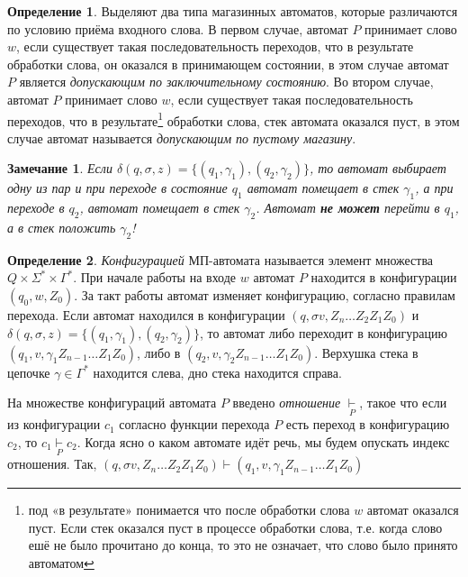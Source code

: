 \documentclass[12pt]{article}
\theoremstyle{definiton}
\newtheorem{Remark}{Замечание}
\theoremstyle{definition}
\theoremstyle{definition}
\newtheorem{Def}{Определение}
\begin{document}
\begin{Def}
	Выделяют два типа магазинных автоматов, которые различаются по условию приёма входного слова. В первом случае, автомат $P$ принимает слово $w$, если существует такая последовательность переходов, что в результате обработки слова, он оказался в принимающем состоянии, в этом случае автомат $P$ является \emph{допускающим по заключительному состоянию}. Во втором случае, автомат $P$ принимает слово $w$, если существует такая последовательность переходов, что в результате\footnote{под «в результате» понимается что после обработки слова $w$ автомат оказался пуст. Если стек оказался пуст в процессе обработки слова, т.е. когда слово ешё не было прочитано до конца, то это не означает, что слово было принято автоматом} обработки слова, стек автомата оказался пуст, в этом случае автомат называется \emph{допускающим по пустому магазину}. 
	
\end{Def}

\begin{Remark}
	Если $\delta(q,\sigma,z) = \{(q_1,\gamma_1), (q_2,\gamma_2)  \}$, то автомат выбирает одну из пар и при переходе в состояние $q_1$ автомат помещает в стек $\gamma_1$, а при переходе в $q_2$, автомат помещает в стек $\gamma_2$. Автомат \textbf{не может} перейти в $q_1$, а в стек положить $\gamma_2$!
\end{Remark}

\begin{Def}
	\emph{Конфигурацией} МП-автомата называется элемент множества $Q\times\Sigma^*\times\Gamma^*$. При начале работы на входе $w$ автомат $P$ находится в конфигурации $(q_0,w,Z_0)$. За такт работы автомат изменяет конфигурацию, согласно правилам перехода. Если автомат находился в конфигурации $(q,\sigma v, Z_n\ldots Z_2Z_1Z_0)$ и $\delta(q,\sigma,z) = \{(q_1,\gamma_1), (q_2,\gamma_2)  \}$, то автомат либо переходит в конфигурацию $(q_1,v,\gamma_1Z_{n-1}\ldots Z_1Z_0)$, либо в $(q_2,v,\gamma_2Z_{n-1}\ldots Z_1Z_0)$. Верхушка стека в цепочке $\gamma\in\Gamma^*$ находится слева, дно стека находится справа. 
	
	
	На множестве конфигураций автомата $P$ введено \emph{отношение} $ \underset{P}{\vdash} $, такое что если из конфигурации $c_1$ согласно функции перехода $P$ есть переход в конфигурацию $c_2$, то $c_1 \underset{P}{\vdash} c_2$. Когда ясно о каком автомате идёт речь, мы будем опускать индекс отношения. Так, $(q,\sigma v, Z_n\ldots Z_2Z_1Z_0) \vdash (q_1,v,\gamma_1Z_{n-1}\ldots Z_1Z_0)$
\end{Def}
\end{document}
